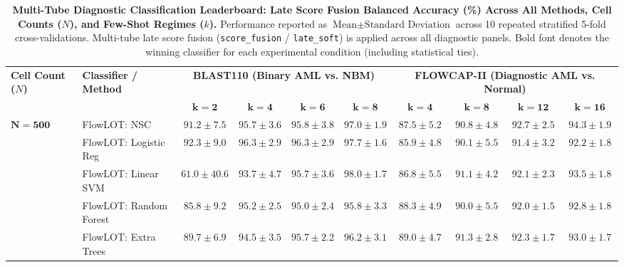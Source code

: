 \documentclass[10pt]{article}
\begin{document}
\begin{table}[p]
\centering
\caption{\textbf{Multi-Tube Diagnostic Classification Leaderboard: Late Score Fusion Balanced Accuracy (\%) Across All Methods, Cell Counts ($N$), and Few-Shot Regimes ($k$).} Performance reported as $\text{Mean} \pm \text{Standard Deviation}$ across 10 repeated stratified 5-fold cross-validations. Multi-tube late score fusion (\texttt{score\_fusion} / \texttt{late\_soft}) is applied across all diagnostic panels. Bold font denotes the winning classifier for each experimental condition (including statistical ties).}
\label{tab:score_fusion_scaling}
\small
\setlength{\tabcolsep}{4.5pt}
\renewcommand{\arraystretch}{1.03}
\begin{tabular}{ll cccc cccc}
\toprule
\multirow{2}{*}{\textbf{Cell Count ($N$)}} & \multirow{2}{*}{\textbf{Classifier / Method}} & \multicolumn{4}{c}{\textbf{BLAST110 (Binary AML vs. NBM)}} & \multicolumn{4}{c}{\textbf{FLOWCAP-II (Diagnostic AML vs. Normal)}} \\
\cmidrule(lr){3-6} \cmidrule(lr){7-10}
 & & $\mathbf{k=2}$ & $\mathbf{k=4}$ & $\mathbf{k=6}$ & $\mathbf{k=8}$ & $\mathbf{k=4}$ & $\mathbf{k=8}$ & $\mathbf{k=12}$ & $\mathbf{k=16}$ \\
\midrule
\multirow{11}{*}{$\mathbf{N = 500}$} & FlowLOT: NSC & $91.2 \pm 7.5$ & $95.7 \pm 3.6$ & $95.8 \pm 3.8$ & $97.0 \pm 1.9$ & $87.5 \pm 5.2$ & $90.8 \pm 4.8$ & $\mathbf{92.7 \pm 2.5}$ & $\mathbf{94.3 \pm 1.9}$ \\
 & FlowLOT: Logistic Reg & $\mathbf{92.3 \pm 9.0}$ & $\mathbf{96.3 \pm 2.9}$ & $96.3 \pm 2.9$ & $97.7 \pm 1.6$ & $85.9 \pm 4.8$ & $90.1 \pm 5.5$ & $91.4 \pm 3.2$ & $92.2 \pm 1.8$ \\
 & FlowLOT: Linear SVM & $61.0 \pm 40.6$ & $93.7 \pm 4.7$ & $95.7 \pm 3.6$ & $\mathbf{98.0 \pm 1.7}$ & $86.8 \pm 5.5$ & $91.1 \pm 4.2$ & $92.1 \pm 2.3$ & $93.5 \pm 1.8$ \\
 & FlowLOT: Random Forest & $85.8 \pm 9.2$ & $95.2 \pm 2.5$ & $95.0 \pm 2.4$ & $95.8 \pm 3.3$ & $88.3 \pm 4.9$ & $90.0 \pm 5.5$ & $92.0 \pm 1.5$ & $92.8 \pm 1.8$ \\
 & FlowLOT: Extra Trees & $89.7 \pm 6.9$ & $94.5 \pm 3.5$ & $95.7 \pm 2.2$ & $96.2 \pm 3.1$ & $89.0 \pm 4.7$ & $\mathbf{91.3 \pm 2.8}$ & $92.3 \pm 1.7$ & $93.0 \pm 1.7$ \\

\end{tabular}
\end{table}
\end{document}
